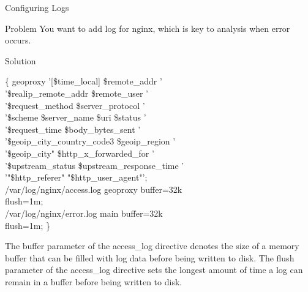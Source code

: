 \documentclass{beamer}
\begin{document}
\begin{frame}{Configuring Logs}

\scriptsize
\begin{block}{Problem}
You want to add log for nginx, which is key to analysis when error occurs.
\end{block}

\begin{block}{Solution}
\begin{Alms*}
	 \{ \NI
		  geoproxy \NI
		'[\$time\_local] \$remote\_addr ' \\
		'\$realip\_remote\_addr \$remote\_user ' \\
		'\$request\_method \$server\_protocol ' \\
		'\$scheme \$server\_name \$uri \$status ' \\
		'\$request\_time \$body\_bytes\_sent ' \\
		'\$geoip\_city\_country\_code3 \$geoip\_region ' \\
		'\$geoip\_city" \$http\_x\_forwarded\_for ' \\
		'\$upstream\_status \$upstream\_response\_time ' \\
		'"\$http\_referer" "\$http\_user\_agent"';
		\ND
		\\
	
		 /var/log/nginx/access.log geoproxy buffer=32k  \\
		flush=1m;
		\\
		 /var/log/nginx/error.log main buffer=32k \\
		flush=1m;
	\ND \}
\end{Alms*}

The buffer parameter of the access\_log directive denotes the size of a memory buffer that can be filled with log data before being written to disk. The flush parameter of the access\_log directive sets the longest amount of time a log can remain in a buffer before being written to disk. 
\end{block}
\end{frame}
\end{document}
